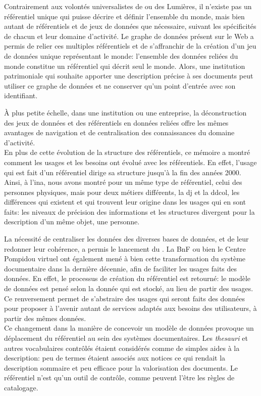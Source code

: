 \noindent Contrairement aux volontés universalistes de  ou des Lumières, il n'existe pas un référentiel unique qui puisse décrire et définir l'ensemble du monde, mais bien autant de référentiels et de jeux de données que nécessaire, suivant les spécificités de chacun et leur domaine d'activité. Le graphe de données présent sur le Web a permis de relier ces multiples référentiels et de s'affranchir de la création d'un jeu de données unique représentant le monde: l'ensemble des données reliées du monde constitue un référentiel qui décrit seul le monde. Alors, une institution patrimoniale qui souhaite apporter une description précise à ses documents peut utiliser ce graphe de données et ne conserver qu'un point d'entrée avec son identifiant.

\noindent À plus petite échelle, dans une institution ou une entreprise, la déconstruction des jeux de données et des référentiels en données reliées offre les mêmes avantages de navigation et de centralisation des connaissances du domaine d'activité.\\

En plus de cette évolution de la structure des référentiels, ce mémoire a montré comment les usages et les besoins ont évolué avec les référentiels. En effet, l'usage qui est fait d'un référentiel dirige sa structure jusqu'à la fin des années 2000. Ainsi, à l'\ac{ina}, nous avons montré pour un même type de référentiel, celui des personnes physiques, mais pour deux métiers différents, la \ac*{dj} et la \ac*{ddcol}, les différences qui existent et qui trouvent leur origine dans les usages qui en sont faits: les niveaux de précision des informations et les structures divergent pour la description d'un même objet, une personne.

\noindent La nécessité de centraliser les données des diverses bases de données, et de leur redonner leur cohérence, a permis le lancement du \ldd. La BnF ou bien le Centre Pompidou virtuel ont également mené à bien cette transformation du système documentaire dans la dernière décennie, afin de faciliter les usages faits des données. En effet, le processus de création du référentiel est retourné: le modèle de données est pensé selon la donnée qui est stocké, au lieu de partir des usages. Ce renversement permet de s'abstraire des usages qui seront faits des données pour proposer à l'avenir autant de services adaptés aux besoins des utilisateurs, à partir des mêmes données.\\

Ce changement dans la manière de concevoir un modèle de données provoque un déplacement du référentiel au sein des systèmes documentaires. Les \textit{thesauri} et autres vocabulaires contrôlés étaient considérés comme de simples aides à la description: peu de termes étaient associés aux notices ce qui rendait la description sommaire et peu efficace pour la valorisation des documents. Le référentiel n'est qu'un outil de contrôle, comme peuvent l'être les règles de catalogage.

